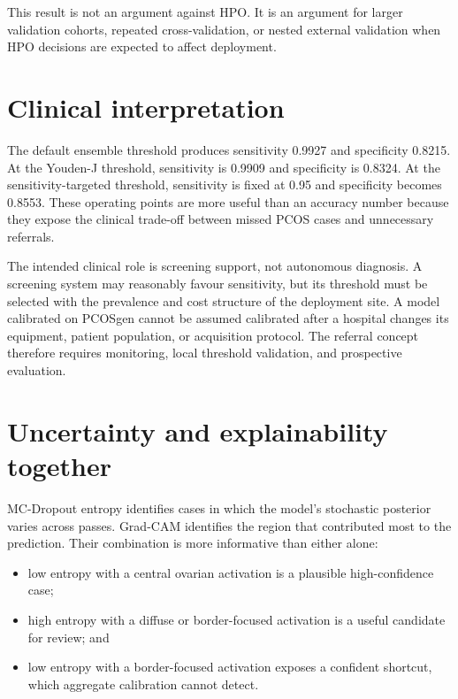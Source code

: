 \documentclass[../preamble.tex]{subfiles}
\begin{document}
This result is not an argument against HPO. It is an argument for larger
validation cohorts, repeated cross-validation, or nested external validation
when HPO decisions are expected to affect deployment.

\section{Clinical interpretation}
\label{sec:discussion-clinical}

The default ensemble threshold produces sensitivity 0.9927 and specificity
0.8215. At the Youden-J threshold, sensitivity is 0.9909 and specificity is
0.8324. At the sensitivity-targeted threshold, sensitivity is fixed at 0.95
and specificity becomes 0.8553. These operating points are more useful than
an accuracy number because they expose the clinical trade-off between missed
PCOS cases and unnecessary referrals.

The intended clinical role is screening support, not autonomous diagnosis.
A screening system may reasonably favour sensitivity, but its threshold
must be selected with the prevalence and cost structure of the deployment
site. A model calibrated on PCOSgen cannot be assumed calibrated after a
hospital changes its equipment, patient population, or acquisition protocol.
The referral concept therefore requires monitoring, local threshold
validation, and prospective evaluation.

\section{Uncertainty and explainability together}
\label{sec:discussion-trust}

MC-Dropout entropy identifies cases in which the model's stochastic posterior
varies across passes. Grad-CAM identifies the region that contributed most to
the prediction. Their combination is more informative than either alone:

\begin{itemize}
  \item low entropy with a central ovarian activation is a plausible
        high-confidence case;
  \item high entropy with a diffuse or border-focused activation is a useful
        candidate for review; and
  \item low entropy with a border-focused activation exposes a confident
        shortcut, which aggregate calibration cannot detect.
\end{itemize}
\end{document}
